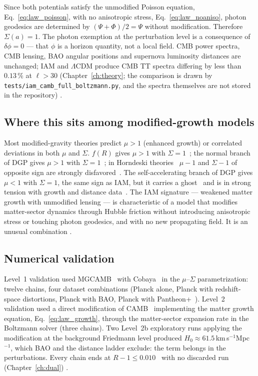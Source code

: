 Since both potentials satisfy the unmodified Poisson equation, Eq.~\eqref{eq:law_poisson}, with no anisotropic stress, Eq.~\eqref{eq:law_noaniso}, photon
geodesics are determined by $(\Psi+\Phi)/2=\Psi$ without modification. Therefore $\Sigma(a)=1$. The photon exemption at the perturbation level is a
consequence of $\delta\phi=0$ --- that $\phi$ is a horizon quantity, not a local field. CMB power spectra, CMB lensing, BAO angular positions and supernova
luminosity distances are unchanged; IAM and $\Lambda$CDM produce CMB TT spectra differing by less than $0.13\,\%$ at $\ell>30$ (Chapter~\ref{ch:theory}; the comparison is drawn by \texttt{tests/\allowbreak{}iam\_camb\_full\_boltzmann.py}, and the spectra themselves are not stored in the repository) \calc.

\subsection{Where this sits among modified-growth models}
Most modified-gravity theories predict $\mu>1$ (enhanced growth) or correlated deviations in both $\mu$ and $\Sigma$. $f(R)$ gives $\mu>1$ with
$\Sigma=1$~\cite{PogosianSilvestri2008}; the normal branch of DGP gives $\mu>1$ with $\Sigma=1$~\cite{DGP2000,KoyamaMaartens2006}; in Horndeski
theories~\cite{Horndeski1974} $\mu-1$ and $\Sigma-1$ of opposite sign are strongly disfavored~\cite{PogosianSilvestri2016}. The self-accelerating branch of
DGP gives $\mu<1$ with $\Sigma=1$, the same sign as IAM, but it carries a ghost~\cite{Koyama2007} and is in strong tension with growth and distance
data~\cite{Fang2008}. The IAM signature --- weakened matter growth with unmodified lensing --- is characteristic of a model that modifies matter-sector dynamics
through Hubble friction without introducing anisotropic stress or touching photon geodesics, and with no new propagating field. It is an unusual
combination \observed.

\subsection{Numerical validation}
Level~1 validation used MGCAMB~\cite{Zhao2009MGCAMB,Wang2023MGCAMB} with Cobaya~\cite{Torrado2021} in the $\mu$--$\Sigma$ parametrization: twelve chains, four
dataset combinations (Planck alone, Planck with redshift-space distortions, Planck with BAO, Planck with Pantheon+~\cite{Brout2022}). Level~2 validation used
a direct modification of CAMB~\cite{Lewis2000CAMB} implementing the matter growth equation, Eq.~\eqref{eq:law_growth}, through the matter-sector expansion rate
in the Boltzmann solver (three chains). Two Level~2b exploratory runs applying the modification at the background Friedmann level produced
$H_0\approx61.5$\,km\,s$^{-1}$Mpc$^{-1}$, which BAO and the distance ladder exclude: the term belongs in the perturbations. Every chain ends at
$R-1\le0.010$~\cite{Gelman1992} with no discarded run (Chapter~\ref{ch:dual}) \measured.

